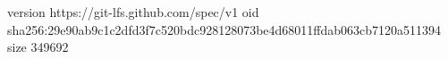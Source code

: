 version https://git-lfs.github.com/spec/v1
oid sha256:29e90ab9c1c2dfd3f7c520bdc928128073be4d68011ffdab063cb7120a511394
size 349692
